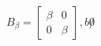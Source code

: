 \documentclass[preview]{standalone}
\begin{document}
\begin{align*}
B_{\beta} = \begin{bmatrix} \beta & 0 \\ 0 & \beta\end{bmatrix}, b \not 0
\end{align*}
\end{document}
